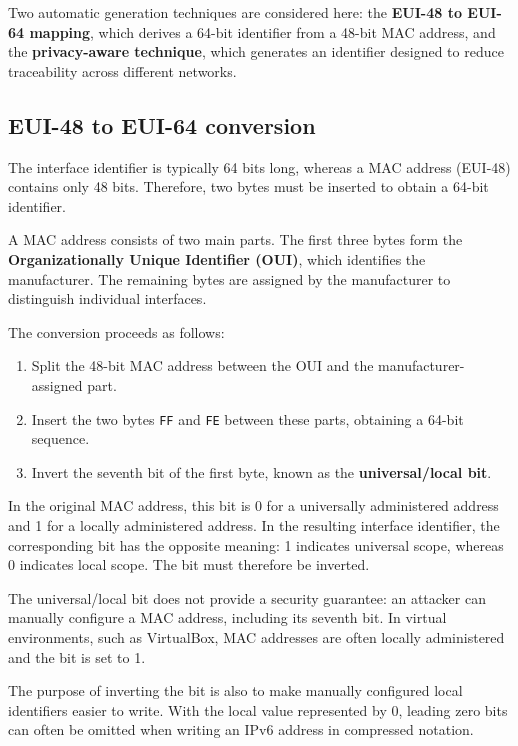 Two automatic generation techniques are considered here:
the \textbf{EUI-48 to EUI-64 mapping}, which derives a 64-bit
identifier from a 48-bit MAC address, and the \textbf{privacy-aware
	technique}, which generates an identifier designed to reduce
traceability across different networks.


\subsection{EUI-48 to EUI-64 conversion}

The interface identifier is typically 64 bits long, whereas a MAC
address (EUI-48) contains only 48 bits. Therefore, two bytes must be
inserted to obtain a 64-bit identifier.

A MAC address consists of two main parts. The first three bytes form
the \textbf{Organizationally Unique Identifier (OUI)}, which identifies
the manufacturer. The remaining bytes are assigned by the manufacturer
to distinguish individual interfaces.


\begin{center}
\end{center}

\pagebreak
The conversion proceeds as follows:

\begin{enumerate}
	\item Split the 48-bit MAC address between the OUI and the
	manufacturer-assigned part.
	\item Insert the two bytes \texttt{FF} and \texttt{FE} between these
	parts, obtaining a 64-bit sequence.
	\item Invert the seventh bit of the first byte, known as the
	\textbf{universal/local bit}.
\end{enumerate}

In the original MAC address, this bit is 0 for a universally
administered address and 1 for a locally administered address. In
the resulting interface identifier, the corresponding bit has the
opposite meaning: 1 indicates universal scope, whereas 0 indicates
local scope. The bit must therefore be inverted.

The universal/local bit does not provide a security guarantee:
an attacker can manually configure a MAC address, including its
seventh bit. In virtual environments, such as VirtualBox, MAC
addresses are often locally administered and the bit is set to 1.

The purpose of inverting the bit is also to make manually configured
local identifiers easier to write. With the local value represented
by 0, leading zero bits can often be omitted when writing an IPv6
address in compressed notation.

